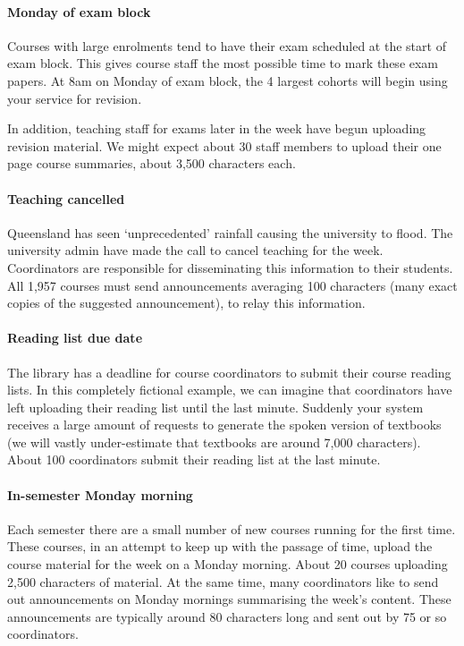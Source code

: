 \documentclass{csse4400}
\begin{document}
\paragraph{Monday of exam block}
Courses with large enrolments tend to have their exam scheduled at the start of exam block.
This gives course staff the most possible time to mark these exam papers.
At 8am on Monday of exam block,
the 4 largest cohorts will begin using your service for revision.

In addition, teaching staff for exams later in the week have begun uploading revision material.
We might expect about 30 staff members to upload their one page course summaries,
about 3,500 characters each.

\paragraph{Teaching cancelled}
Queensland has seen `unprecedented' rainfall causing the university to flood.
The university admin have made the call to cancel teaching for the week.
Coordinators are responsible for disseminating this information to their students.
All 1,957 courses must send announcements averaging 100 characters (many exact copies of the suggested announcement),
to relay this information.

\paragraph{Reading list due date}
The library has a deadline for course coordinators to submit their course reading lists.
In this completely fictional example,
we can imagine that coordinators have left uploading their reading list until the last minute.
Suddenly your system receives a large amount of requests to generate the spoken version of textbooks (we will vastly under-estimate that textbooks are around 7,000 characters).
About 100 coordinators submit their reading list at the last minute.

\paragraph{In-semester Monday morning}
Each semester there are a small number of new courses running for the first time.
These courses, in an attempt to keep up with the passage of time,
upload the course material for the week on a Monday morning.
About 20 courses uploading 2,500 characters of material.
At the same time, many coordinators like to send out announcements on Monday mornings summarising the week's content.
These announcements are typically around 80 characters long and sent out by 75 or so coordinators.
\end{document}
